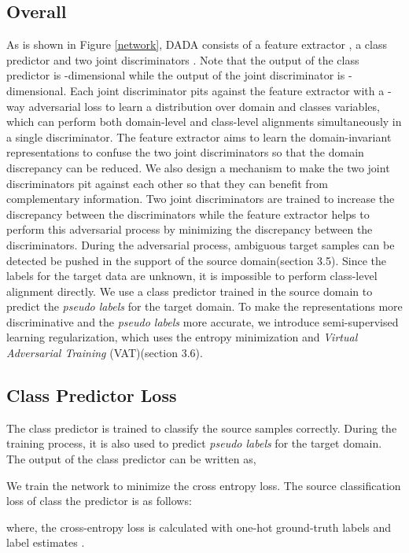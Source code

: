 \documentclass{ecai}
\begin{document}
\subsection{Overall}

As is shown in Figure \ref{network}, DADA consists of a feature extractor , a class predictor  and
 two joint discriminators . Note that the output of the class predictor is -dimensional
  while the output of the joint discriminator is -dimensional. Each joint discriminator pits against the feature extractor with a -way adversarial loss to learn a distribution over domain and classes variables, which can perform both domain-level and class-level alignments simultaneously in a single discriminator.
  The feature extractor  aims to learn the domain-invariant representations to confuse the two joint discriminators  so that the domain discrepancy can be reduced. We also design a mechanism to make the two joint discriminators pit against each other so that they can benefit from complementary information. Two joint discriminators are trained to increase the discrepancy between the discriminators while the feature extractor helps to perform this adversarial process by minimizing the discrepancy between the discriminators. During the adversarial process, ambiguous target samples can be detected  be pushed in the support of the source domain(section 3.5). Since the labels for the target data are unknown, it is impossible to perform class-level alignment directly. We use a class predictor  trained in the source domain to predict the {\emph{pseudo labels}} for the target domain. To make the representations more discriminative and the {\emph{pseudo labels}} more accurate, we introduce semi-supervised learning  regularization, which uses the entropy minimization and {\emph{Virtual Adversarial Training}} (VAT)(section 3.6).


\subsection{Class Predictor Loss}

The class predictor  is trained to classify the source  samples correctly. During the training process, it is also used to predict {\emph{pseudo labels}} for the target domain. The output of the class predictor can be written as,


We train the network to minimize the cross entropy loss. The source classification loss of class the predictor is as follows:

where, the cross-entropy loss is calculated with one-hot ground-truth labels  and label estimates .
\end{document}

